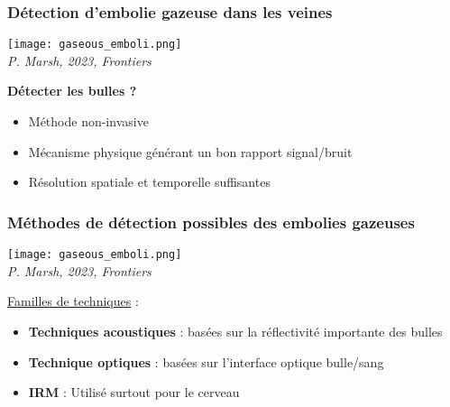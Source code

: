 \documentclass{beamer}
\begin{document}
\begin{frame} 
\frametitle{Détection d'embolie gazeuse dans les veines}
\begin{center}
\texttt{[image: gaseous\_emboli.png]}\\
\textit{P. Marsh, 2023, Frontiers}
\end{center}
\textbf{Détecter les bulles ?}
\begin{itemize}
\item Méthode non-invasive
\item Mécanisme physique générant un bon rapport signal/bruit
\item Résolution spatiale et temporelle suffisantes
\end{itemize}

\end{frame} 

\begin{frame}
\frametitle{Méthodes de détection possibles des embolies gazeuses}
\begin{center}
\texttt{[image: gaseous\_emboli.png]}\\
\textit{P. Marsh, 2023, Frontiers}
\end{center}
\vspace{0.1cm}
\underline{Familles de techniques} :
\vspace{0.1cm}
\begin{itemize}
\item \textbf{Techniques acoustiques} : basées sur la réflectivité importante des bulles 
\vspace{0.1cm}
\item \textbf{Technique optiques} : basées sur l'interface optique bulle/sang
\vspace{0.1cm}
\item \textbf{IRM }: Utilisé surtout pour le cerveau
\end{itemize}

\end{frame}
\end{document}
